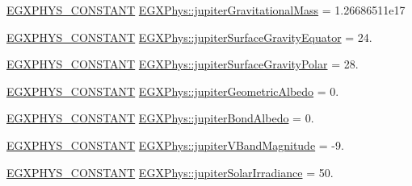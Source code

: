 \begin{DoxyCompactItemize}
\item 
\mbox{\hyperlink{group___e_g_x_phys-_constants-_macros_ga76980d288494ce1714c9ac68a95ba702}{E\+G\+X\+P\+H\+Y\+S\+\_\+\+C\+O\+N\+S\+T\+A\+NT}} \mbox{\hyperlink{group___e_g_x_phys-_constants-_astrophysics-_solar_system-_jupiter-_bulk_ga6489d5b6886e19c3adf729fd28f54b46}{E\+G\+X\+Phys\+::jupiter\+Gravitational\+Mass}} = 1.\+26686511e17
\item 
\mbox{\hyperlink{group___e_g_x_phys-_constants-_macros_ga76980d288494ce1714c9ac68a95ba702}{E\+G\+X\+P\+H\+Y\+S\+\_\+\+C\+O\+N\+S\+T\+A\+NT}} \mbox{\hyperlink{group___e_g_x_phys-_constants-_astrophysics-_solar_system-_jupiter-_bulk_ga453ce834b062055a91b1fd594428fa6c}{E\+G\+X\+Phys\+::jupiter\+Surface\+Gravity\+Equator}} = 24.
\item 
\mbox{\hyperlink{group___e_g_x_phys-_constants-_macros_ga76980d288494ce1714c9ac68a95ba702}{E\+G\+X\+P\+H\+Y\+S\+\_\+\+C\+O\+N\+S\+T\+A\+NT}} \mbox{\hyperlink{group___e_g_x_phys-_constants-_astrophysics-_solar_system-_jupiter-_bulk_ga43cd8191d01a0990fd9104a4521b981b}{E\+G\+X\+Phys\+::jupiter\+Surface\+Gravity\+Polar}} = 28.
\item 
\mbox{\hyperlink{group___e_g_x_phys-_constants-_macros_ga76980d288494ce1714c9ac68a95ba702}{E\+G\+X\+P\+H\+Y\+S\+\_\+\+C\+O\+N\+S\+T\+A\+NT}} \mbox{\hyperlink{group___e_g_x_phys-_constants-_astrophysics-_solar_system-_jupiter-_bulk_ga8ca933493ff89584bc50b7e5bcbb64b2}{E\+G\+X\+Phys\+::jupiter\+Geometric\+Albedo}} = 0.
\item 
\mbox{\hyperlink{group___e_g_x_phys-_constants-_macros_ga76980d288494ce1714c9ac68a95ba702}{E\+G\+X\+P\+H\+Y\+S\+\_\+\+C\+O\+N\+S\+T\+A\+NT}} \mbox{\hyperlink{group___e_g_x_phys-_constants-_astrophysics-_solar_system-_jupiter-_bulk_ga874898a1cbfefdbef696c7043cfc722e}{E\+G\+X\+Phys\+::jupiter\+Bond\+Albedo}} = 0.
\item 
\mbox{\hyperlink{group___e_g_x_phys-_constants-_macros_ga76980d288494ce1714c9ac68a95ba702}{E\+G\+X\+P\+H\+Y\+S\+\_\+\+C\+O\+N\+S\+T\+A\+NT}} \mbox{\hyperlink{group___e_g_x_phys-_constants-_astrophysics-_solar_system-_jupiter-_bulk_ga58ab15a15b0a0512da0f1adae198ec69}{E\+G\+X\+Phys\+::jupiter\+V\+Band\+Magnitude}} = -\/9.
\item 
\mbox{\hyperlink{group___e_g_x_phys-_constants-_macros_ga76980d288494ce1714c9ac68a95ba702}{E\+G\+X\+P\+H\+Y\+S\+\_\+\+C\+O\+N\+S\+T\+A\+NT}} \mbox{\hyperlink{group___e_g_x_phys-_constants-_astrophysics-_solar_system-_jupiter-_bulk_gaba342d5906a24c551ea5c3328b536b29}{E\+G\+X\+Phys\+::jupiter\+Solar\+Irradiance}} = 50.

\end{DoxyCompactItemize}
